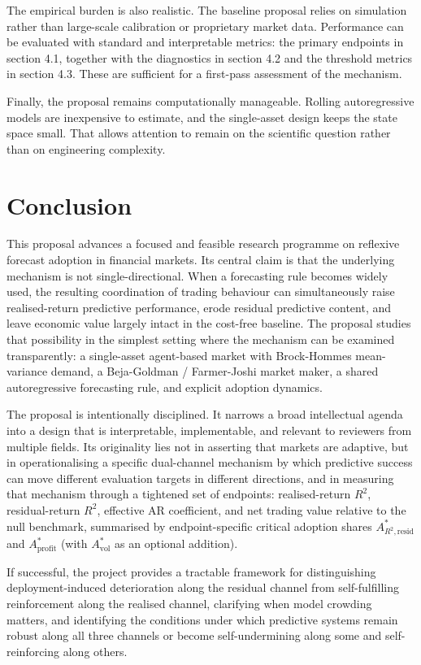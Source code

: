 \documentclass[11pt]{article}
\begin{document}
The empirical burden is also realistic. The baseline proposal relies on simulation rather than large-scale calibration or proprietary market data. Performance can be evaluated with standard and interpretable metrics: the primary endpoints in section 4.1, together with the diagnostics in section 4.2 and the threshold metrics in section 4.3. These are sufficient for a first-pass assessment of the mechanism.

Finally, the proposal remains computationally manageable. Rolling autoregressive models are inexpensive to estimate, and the single-asset design keeps the state space small. That allows attention to remain on the scientific question rather than on engineering complexity.


\section{Conclusion}

This proposal advances a focused and feasible research programme on reflexive forecast adoption in financial markets. Its central claim is that the underlying mechanism is not single-directional. When a forecasting rule becomes widely used, the resulting coordination of trading behaviour can simultaneously raise realised-return predictive performance, erode residual predictive content, and leave economic value largely intact in the cost-free baseline. The proposal studies that possibility in the simplest setting where the mechanism can be examined transparently: a single-asset agent-based market with Brock-Hommes mean-variance demand, a Beja-Goldman / Farmer-Joshi market maker, a shared autoregressive forecasting rule, and explicit adoption dynamics.

The proposal is intentionally disciplined. It narrows a broad intellectual agenda into a design that is interpretable, implementable, and relevant to reviewers from multiple fields. Its originality lies not in asserting that markets are adaptive, but in operationalising a specific dual-channel mechanism by which predictive success can move different evaluation targets in different directions, and in measuring that mechanism through a tightened set of endpoints: realised-return $R^{2}$, residual-return $R^{2}$, effective AR coefficient, and net trading value relative to the null benchmark, summarised by endpoint-specific critical adoption shares $A^{*}_{R^{2},\mathrm{resid}}$ and $A^{*}_{\mathrm{profit}}$ (with $A^{*}_{\mathrm{vol}}$ as an optional addition).

If successful, the project provides a tractable framework for distinguishing deployment-induced deterioration along the residual channel from self-fulfilling reinforcement along the realised channel, clarifying when model crowding matters, and identifying the conditions under which predictive systems remain robust along all three channels or become self-undermining along some and self-reinforcing along others.
\end{document}
